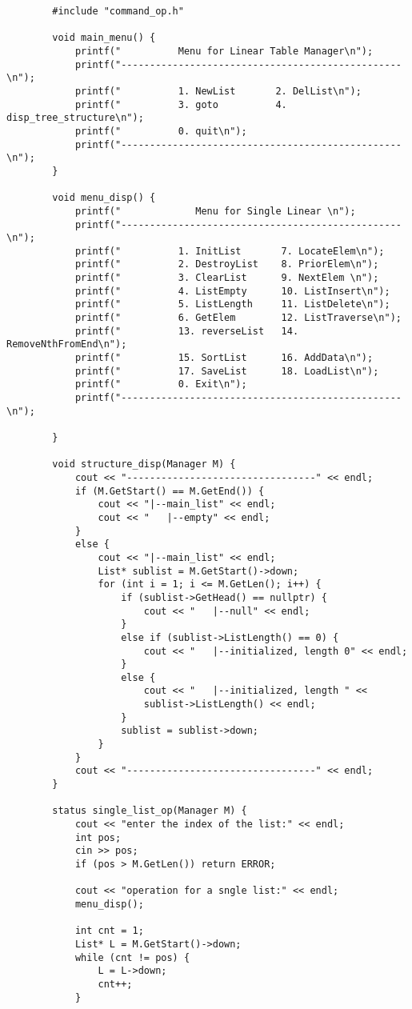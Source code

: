 \documentclass[supercite]{Experimental_Report}
\begin{document}
	\begin{lstlisting}
		#include "command_op.h"
		
		void main_menu() {
			printf("          Menu for Linear Table Manager\n");
			printf("-------------------------------------------------\n");
			printf("    	  1. NewList       2. DelList\n");
			printf("          3. goto          4. disp_tree_structure\n");
			printf("          0. quit\n");
			printf("-------------------------------------------------\n");
		}
		
		void menu_disp() {
			printf("             Menu for Single Linear \n");
			printf("-------------------------------------------------\n");
			printf("    	  1. InitList       7. LocateElem\n");
			printf("    	  2. DestroyList    8. PriorElem\n");
			printf("    	  3. ClearList      9. NextElem \n");
			printf("    	  4. ListEmpty      10. ListInsert\n");
			printf("    	  5. ListLength     11. ListDelete\n");
			printf("    	  6. GetElem        12. ListTraverse\n");
			printf("          13. reverseList   14. RemoveNthFromEnd\n");
			printf("          15. SortList      16. AddData\n");
			printf("          17. SaveList      18. LoadList\n");
			printf("    	  0. Exit\n");
			printf("-------------------------------------------------\n");
			
		}
		
		void structure_disp(Manager M) {
			cout << "---------------------------------" << endl;
			if (M.GetStart() == M.GetEnd()) {
				cout << "|--main_list" << endl;
				cout << "   |--empty" << endl;
			}
			else {
				cout << "|--main_list" << endl;
				List* sublist = M.GetStart()->down;
				for (int i = 1; i <= M.GetLen(); i++) {
					if (sublist->GetHead() == nullptr) {
						cout << "   |--null" << endl;
					}
					else if (sublist->ListLength() == 0) {
						cout << "   |--initialized, length 0" << endl;
					}
					else {
						cout << "   |--initialized, length " << 
						sublist->ListLength() << endl;
					}
					sublist = sublist->down;
				}
			}
			cout << "---------------------------------" << endl;
		}
		
		status single_list_op(Manager M) {
			cout << "enter the index of the list:" << endl;
			int pos;
			cin >> pos;
			if (pos > M.GetLen()) return ERROR;
			
			cout << "operation for a sngle list:" << endl;
			menu_disp();
			
			int cnt = 1;
			List* L = M.GetStart()->down;
			while (cnt != pos) {
				L = L->down;
				cnt++;
			}
			

\end{lstlisting}
\end{document}
